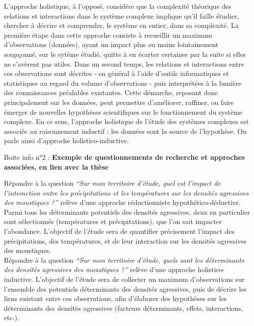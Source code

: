 \documentclass[12pt,twoside]{reedthesis}
\begin{document}
L'approche holistique, à l'opposé, considère que la complexité théorique des relations et interactions dans le système complexe implique qu'il faille étudier, chercher à décrire et comprendre, le système en entier, dans sa complexité. La première étape dans cette approche consiste à recueillir un maximum d'observations (données), ayant un impact plus ou moins lointainement soupçonné, sur le sytème étudié, quitte à en écarter certaines par la suite si elles ne s'avèrent pas utiles. Dans un second temps, les relations et interactions entre ces observations sont décrites - en général à l'aide d'outils informatiques et statistiques au regard du volume d'observations - puis interprétées à la lumière des connaissances préalables existantes. Cette démarche, reposant donc principalement sur les données, peut permettre d'améliorer, raffiner, ou faire émerger de nouvelles hypothèses scientifiques sur le fonctionnement du système complexe. En ce sens, l'approche holistique de l'étude des systèmes complexes est associée au raisonnement inductif : les données sont la source de l'hypothèse. On parle ainsi d'approche holistico-inductive.\\

\hfill\break
\begin{lightcyanbox}
\begin{center}
Boite info n°2 : \textbf{Exemple de questionnements de recherche et approches associées, en lien avec la thèse}

\end{center}
Répondre à la question \emph{``Sur mon territoire d'étude, quel est l'impact de l'interaction entre les précipitations et les températures sur les densités agressives des moustiques ?''} relève d'une approche réductionniste hypothético-déductive. Parmi tous les déterminants potentiels des densités agressives, deux en particulier sont sélectionnés (températures et précipitations), que l'on sait impacter l'abondance. L'objectif de l'étude sera de quantifier précisement l'impact des précipitations, des températures, et de leur interaction sur les densités agressives des moustiques.\\

Répondre à la question \emph{``Sur mon territoire d'étude, quels sont les déterminants des densités agressives des moustiques ?''} relève d'une approche holistico-inductive. L'objectif de l'étude sera de collecter un maximum d'observations sur l'ensemble des potentiels déterminants des densités agressives, puis de décrire les liens existant entre ces observations, afin d'élaborer des hypothèses sur les déterminants des densités agressives (facteurs déterminants, effets, interactions, etc.).

\end{lightcyanbox}
\hfill\break
\end{document}
